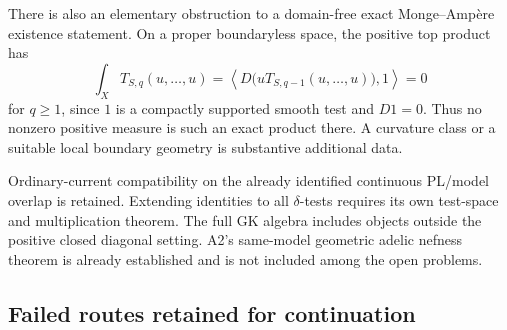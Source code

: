 \documentclass[11pt,a4paper]{article}
\numberwithin{equation}{section}
\theoremstyle{definition}
\theoremstyle{remark}
\begin{document}
There is also an elementary obstruction to a domain-free exact
Monge--Amp\`ere existence statement. On a proper boundaryless space,
the positive top product has
\[
 \int_X T_{S,q}(u,\ldots,u)
   =\left\langle D\bigl(uT_{S,q-1}(u,\ldots,u)\bigr),1\right\rangle
   =0
\]
for $q\geq1$, since $1$ is a compactly supported smooth test and
$D1=0$. Thus no nonzero positive measure is such an exact product
there. A curvature class or a suitable local boundary geometry is
substantive additional data.

Ordinary-current compatibility on the already identified continuous
PL/model overlap is retained. Extending identities to all
$\delta$-tests requires its own test-space and multiplication theorem.
The full GK algebra includes objects outside the positive closed
diagonal setting. A2's same-model geometric adelic nefness theorem is
already established and is not included among the open problems.

\subsection{Failed routes retained for continuation}
\end{document}

